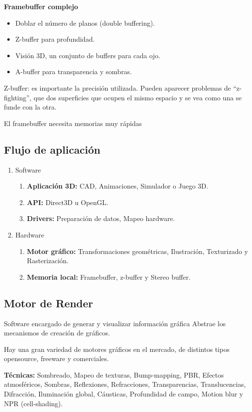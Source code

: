 \textbf{Framebuffer complejo}
\begin{itemize}
	\item Doblar el número de planos (double buffering).
	\item Z-buffer para profundidad.
	\item Visión 3D, un conjunto de buffers para cada ojo.
	\item A-buffer para transparencia y sombras.
\end{itemize}


Z-buffer: es importante la precisión utilizada. Pueden aparecer problemas de \enquote{z-fighting}, que dos superficies que ocupen el mismo espacio y se vea como una se funde con la otra.

El framebuffer necesita memorias muy rápidas
\pagebreak

\subsection{Flujo de aplicación}\label{subsec:flujo-de-aplicación}
\begin{enumerate}
	\item Software
	      \begin{enumerate}
		      \item \textbf{Aplicación 3D:} CAD, Animaciones, Simulador o Juego 3D\@.
		      \item \textbf{API:} Direct3D u OpenGL\@.
		      \item \textbf{Drivers:} Preparación de datos, Mapeo hardware.
	      \end{enumerate}
	\item Hardware
	      \begin{enumerate}
		      \item \textbf{Motor gráfico:} Transformaciones geométricas, Ilustración, Texturizado y Rasterización.
		      \item \textbf{Memoria local:} Framebuffer, z-buffer y Stereo buffer.
	      \end{enumerate}
\end{enumerate}

\subsection{Motor de Render}\label{subsec:motor-de-render}
Software encargado de generar y visualizar información gráfica Abstrae los mecanismos de creación de gráficos.

Hay una gran variedad de motores gráficos en el mercado, de distintos tipos opensource, freeware y comerciales.

\textbf{Técnicas:} Sombreado, Mapeo de texturas, Bump-mapping, PBR, Efectos atmosféricos, Sombras, Reflexiones, Refracciones, Transparencias, Translucencias, Difracción, Iluminación global, Cáusticas, Profundidad de campo, Motion blur y NPR (cell-shading).